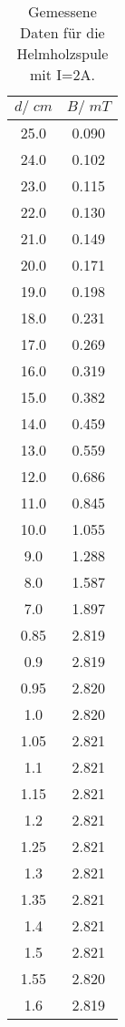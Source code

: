 \begin{table}[H]
  \centering
   \begin{tabular}{c c}
    \toprule
    $d /\;\si{cm}$ & $B/\;\si{mT}$ \\
    \midrule
    25.0 & 0.090\\
    24.0 & 0.102\\
    23.0 & 0.115\\
    22.0 & 0.130\\
    21.0 & 0.149\\
    20.0 & 0.171\\
    19.0 & 0.198\\
    18.0 & 0.231\\
    17.0 & 0.269\\
    16.0 & 0.319\\
    15.0 & 0.382\\
    14.0 & 0.459\\
    13.0 & 0.559\\
    12.0 & 0.686\\
    11.0 & 0.845\\
    10.0 & 1.055\\
    9.0 & 1.288\\
    8.0 & 1.587\\
    7.0 & 1.897\\
    0.85 & 2.819\\
    \hline
    0.9 & 2.819\\
    0.95 & 2.820\\
    1.0 & 2.820\\
    1.05 & 2.821\\
    1.1 & 2.821\\
    1.15 & 2.821\\
    1.2 & 2.821\\
    1.25 & 2.821\\
    1.3 & 2.821\\
    1.35 & 2.821\\
    1.4 & 2.821\\
    1.5 & 2.821\\
    1.55 & 2.820\\
    1.6 & 2.819\\
    \bottomrule
  \end{tabular}
  \caption{Gemessene Daten für die Helmholzspule mit I=2A.}
  \label{tab:tabelle3}
\end{table}
